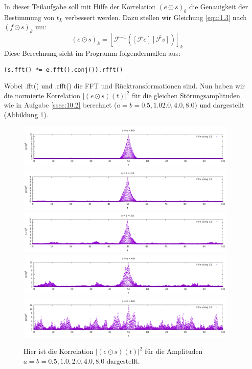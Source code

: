 \documentclass[ngerman]{scrartcl}
\begin{document}
In dieser Teilaufgabe soll mit Hilfe der Korrelation $(e \odot s)_k$
die Genauigkeit der Bestimmung von $t_L$ verbessert werden.
Dazu stellen wir Gleichung \ref{equ:1.3} nach $(f \odot s)_k$ um:
\begin{equation*}
	(e \odot s)_{k}=\left[\mathcal{F}^{-1}\left( [\mathcal{F} e] \overline{[\mathcal{F} s]}\right)\right]_{k}
\end{equation*}
Diese Berechnung sieht im Programm folgendermaßen aus:
\begin{lstlisting}[style=CStyle]
	(s.fft() *= e.fft().conj()).rfft()
\end{lstlisting}
Wobei .fft() und .rfft() die FFT und Rücktransformationen sind.
Nun haben wir die normierte Korrelation $|(e \odot s)(t)|^{2}$ für die gleichen Störungsamplituden wie in Aufgabe \ref{ssec:10.2} berechnet ($a=b=0.5,1.0 2.0, 4.0, 8.0$) und dargestellt (Abbildung \ref{fig:3.1}).
\begin{figure}[htbp]
	\centering
	\includegraphics[width=0.98\textwidth]{plots/korrelation/0.5}
	\includegraphics[width=0.98\textwidth]{plots/korrelation/1.0}
	\includegraphics[width=0.98\textwidth]{plots/korrelation/2.0}
	\includegraphics[width=0.98\textwidth]{plots/korrelation/4.0}
	\includegraphics[width=0.98\textwidth]{plots/korrelation/8.0}
	\caption[$|(e \odot s)(t)|^2$]{Hier ist die Korrelation $|(e \odot s)(t)|^2$ für die Amplituden \\ $a=b=0.5, 1.0, 2.0, 4.0, 8.0$ dargestellt.}
	\label{fig:3.1}
\end{figure} 
\end{document}
